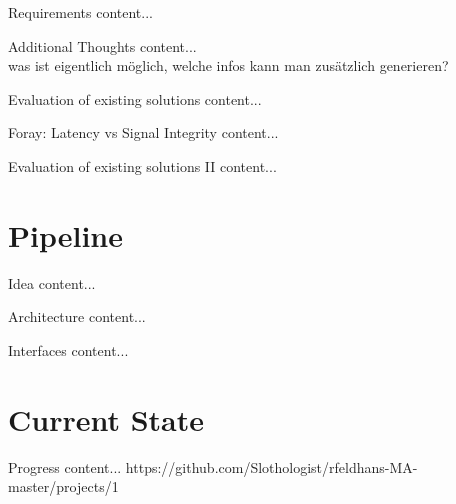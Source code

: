 \documentclass{beamer}
\begin{document}
	
	\begin{frame}{Requirements}
		content...
	\end{frame}
	
	
	\begin{frame}{Additional Thoughts}
		content...\\
		was ist eigentlich möglich, welche infos kann man zusätzlich generieren?
	\end{frame}

	\begin{frame}{Evaluation of existing solutions}
		content...
	\end{frame}
	
	\begin{frame}{Foray: Latency vs Signal Integrity}
		content...
	\end{frame}
	
	\begin{frame}{Evaluation of existing solutions II}
		content...
	\end{frame}
	
	
	
	
	
	

	\section{Pipeline}
	
	\begin{frame}{Idea}
		content...
	\end{frame}
	
	\begin{frame}{Architecture}
		content...
	\end{frame}
	
	\begin{frame}{Interfaces}
		content...
	\end{frame}
	
	
	
	
	
	
	
	
	\section{Current State}
	\begin{frame}{Progress}
		content...
		https://github.com/Slothologist/rfeldhans-MA-master/projects/1
	\end{frame}
	
	
	
	
	
\end{document}
